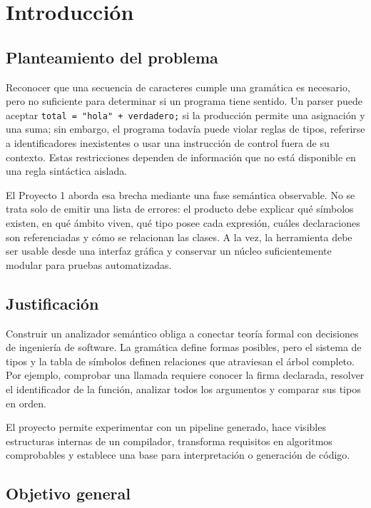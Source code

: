 \documentclass[11pt,letterpaper,oneside]{report}
\newcommand{\codigo}[1]{\texttt{#1}}
\begin{document}
\tableofcontents
\listoffigures
\listoftables
\clearpage
{}

\chapter{Introducción}

\section{Planteamiento del problema}

Reconocer que una secuencia de caracteres cumple una gramática es necesario, pero no
suficiente para determinar si un programa tiene sentido. Un parser puede aceptar
\codigo{total = "hola" + verdadero;} si la producción permite una asignación y una
suma; sin embargo, el programa todavía puede violar reglas de tipos, referirse a
identificadores inexistentes o usar una instrucción de control fuera de su contexto.
Estas restricciones dependen de información que no está disponible en una regla
sintáctica aislada.

El Proyecto 1 aborda esa brecha mediante una fase semántica observable. No se trata
solo de emitir una lista de errores: el producto debe explicar qué símbolos existen,
en qué ámbito viven, qué tipo posee cada expresión, cuáles declaraciones son
referenciadas y cómo se relacionan las clases. A la vez, la herramienta debe ser
usable desde una interfaz gráfica y conservar un núcleo suficientemente modular para
pruebas automatizadas.

\section{Justificación}

Construir un analizador semántico obliga a conectar teoría formal con decisiones de
ingeniería de software. La gramática define formas posibles, pero el sistema de tipos
y la tabla de símbolos definen relaciones que atraviesan el árbol completo. Por
ejemplo, comprobar una llamada requiere conocer la firma declarada, resolver el
identificador de la función, analizar todos los argumentos y comparar sus tipos en
orden.

El proyecto permite experimentar con un pipeline generado, hace visibles estructuras
internas de un compilador, transforma requisitos en algoritmos comprobables y
establece una base para interpretación o generación de código.

\section{Objetivo general}
\end{document}
